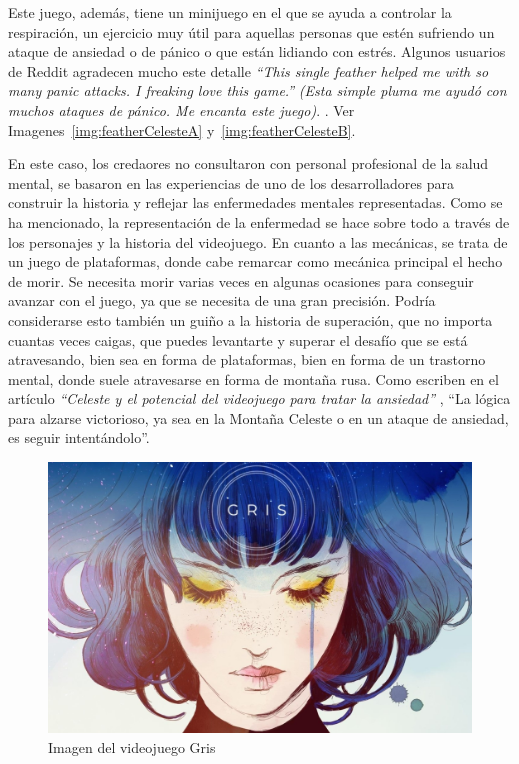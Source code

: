 \documentclass[12pt, a4paper,twoside,titlepage]{book}
\begin{document}
Este juego, además, tiene un minijuego en el que se ayuda a controlar la respiración, un ejercicio muy útil para aquellas personas que estén sufriendo un ataque de ansiedad o de pánico o que están lidiando con estrés. Algunos usuarios de Reddit agradecen mucho este detalle \textit{``This single feather helped me with so many panic attacks. I freaking love this game.''} \textit{(Esta simple pluma me ayudó con muchos ataques de pánico. Me encanta este juego)}. \cite{featheceleste}. Ver Imagenes~\ref{img:featherCelesteA} y~\ref{img:featherCelesteB}.  

En este caso, los credaores no consultaron con personal profesional de la salud mental, se basaron en las experiencias de uno de los desarrolladores para construir la historia y reflejar las enfermedades mentales representadas. 
Como se ha mencionado, la representación de la enfermedad se hace sobre todo a través de los personajes y la historia del videojuego. En cuanto a las mecánicas, se trata de un juego de plataformas, donde cabe remarcar como mecánica principal el hecho de morir. Se necesita morir varias veces en algunas ocasiones para conseguir avanzar con el juego, ya que se necesita de una gran precisión. Podría considerarse esto también un guiño a la historia de superación, que no importa cuantas veces caigas, que puedes levantarte y superar el desafío que se está atravesando, bien sea en forma de plataformas, bien en forma de un trastorno mental, donde suele atravesarse en forma de montaña rusa. Como escriben en el artículo \textit{``Celeste y el potencial del videojuego para tratar la ansiedad''} \cite{articuloCeleste}, ``La lógica para alzarse victorioso, ya sea en la Montaña Celeste o en un ataque de ansiedad, es seguir intentándolo''. 


\begin{figure}
	\centering
	\includegraphics[width=.8\linewidth]{Imagenes videojuegos/gris.jpeg}
	\caption{Imagen del videojuego Gris}
	\label{img:gris}
\end{figure}
\end{document}
